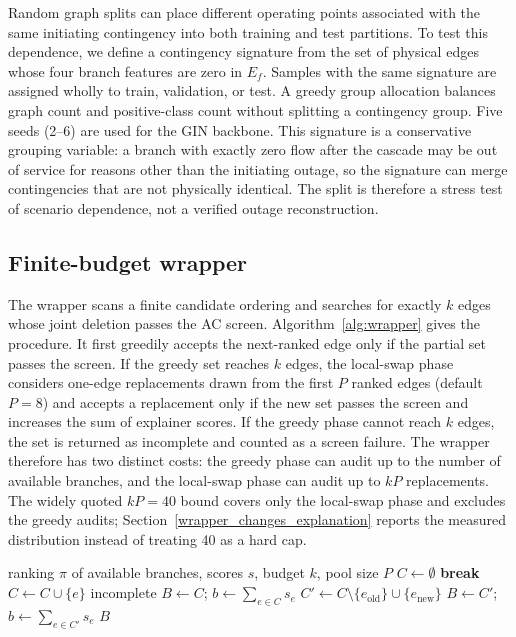 Random graph splits can place different operating points associated with the same initiating contingency into both training and test partitions. To test this dependence, we define a contingency signature from the set of physical edges whose four branch features are zero in $E_f$. Samples with the same signature are assigned wholly to train, validation, or test. A greedy group allocation balances graph count and positive-class count without splitting a contingency group. Five seeds (2--6) are used for the GIN backbone. This signature is a conservative grouping variable: a branch with exactly zero flow after the cascade may be out of service for reasons other than the initiating outage, so the signature can merge contingencies that are not physically identical. The split is therefore a stress test of scenario dependence, not a verified outage reconstruction.

\subsection{Finite-budget wrapper}\label{feasibility_wrapper}

The wrapper scans a finite candidate ordering and searches for exactly $k$ edges whose joint deletion passes the AC screen. Algorithm~\ref{alg:wrapper} gives the procedure. It first greedily accepts the next-ranked edge only if the partial set passes the screen. If the greedy set reaches $k$ edges, the local-swap phase considers one-edge replacements drawn from the first $P$ ranked edges (default $P=8$) and accepts a replacement only if the new set passes the screen and increases the sum of explainer scores. If the greedy phase cannot reach $k$ edges, the set is returned as incomplete and counted as a screen failure. The wrapper therefore has two distinct costs: the greedy phase can audit up to the number of available branches, and the local-swap phase can audit up to $kP$ replacements. The widely quoted $kP=40$ bound covers only the local-swap phase and excludes the greedy audits; Section~\ref{wrapper_changes_explanation} reports the measured distribution instead of treating 40 as a hard cap.

\begin{algorithm}[t]
\caption{Local-swap screening wrapper}\label{alg:wrapper}
\begin{algorithmic}[1]
\Require ranking $\pi$ of available branches, scores $s$, budget $k$, pool size $P$
\State $C\gets\emptyset$
   \textbf{break} \EndIf
   $C\gets C\cup\{e\}$ \EndIf
\EndFor
{} \Return incomplete \EndIf
\State $B\gets C$; \quad $b\gets\sum_{e\in C}s_e$
    \State $C'\gets C\setminus\{e_{\mathrm{old}}\}\cup\{e_{\mathrm{new}}\}$
      $B\gets C'$; \quad $b\gets\sum_{e\in C'}s_e$
    \EndIf
  \EndFor
\EndFor
\State \Return $B$
\end{algorithmic}
\end{algorithm}

